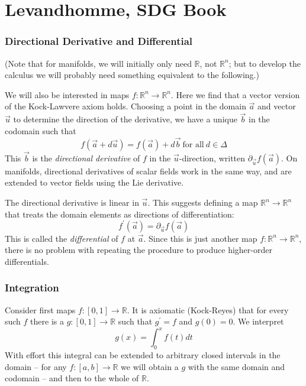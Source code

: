 \documentclass[oneside,english]{amsbook}
\numberwithin{section}{chapter}
\theoremstyle{plain}
\theoremstyle{definition}
\begin{document}
\chapter{Levandhomme, SDG Book}

\subsection{Directional Derivative and Differential}
(Note that for manifolds, we will initially only need $\mathbb{R}$, not $\mathbb{R}^n$; but to develop the calculus we will probably need something equivalent to the following.)

We will also be interested in maps $f:\mathbb{R}^n\to \mathbb{R}^n$. Here we find that a vector version of the Kock-Lawvere axiom holds. Choosing a point  in the domain $\overrightarrow{a}$ and vector $\overrightarrow{u}$ to determine the direction of the derivative, we have a unique $\overrightarrow{b}$ in the codomain such that
\[
f(\overrightarrow{a} + d\overrightarrow{u}) = f(\overrightarrow{a}) + d\overrightarrow{b}\ \text{for all}\ d\in\Delta
\] 
This $\overrightarrow{b}$ is the \emph{directional derivative} of $f$ in the $\overrightarrow{u}$-direction, written $\partial_{\overrightarrow{u}}f(\overrightarrow{a})$. On manifolds, directional derivatives of scalar fields work in the same way, and are extended to vector fields using the Lie derivative.

The directional derivative is linear in $\overrightarrow{u}$. This suggests defining a map $\mathbb{R}^n\to \mathbb{R}^n$ that treats the domain elements as directions of differentiation:
\[
f^\prime(\overrightarrow{a}) = \partial_{\overrightarrow{u}}f(\overrightarrow{a})
\]
This is called the \emph{differential} of $f$ at $\overrightarrow{a}$. Since this is just another map $f:\mathbb{R}^n\to \mathbb{R}^n$, there is no problem with repeating the procedure to produce higher-order differentials.

\subsection{Integration}

Consider first maps $f:[0, 1]\to\mathbb{R}$. It is axiomatic (Kock-Reyes) that for every such $f$ there is a $g:[0, 1]\to\mathbb{R}$ such that $g^\prime=f$ and $g(0)=0$. We interpret 
\[
g(x) = \int_0^x f(t) dt
\]
With effort this integral can be extended to arbitrary closed intervals in the domain -- for any $f:[a, b]\to\mathbb{R}$ we will obtain a $g$ with the same domain and codomain -- and then to the whole of $\mathbb{R}$.
\end{document}
